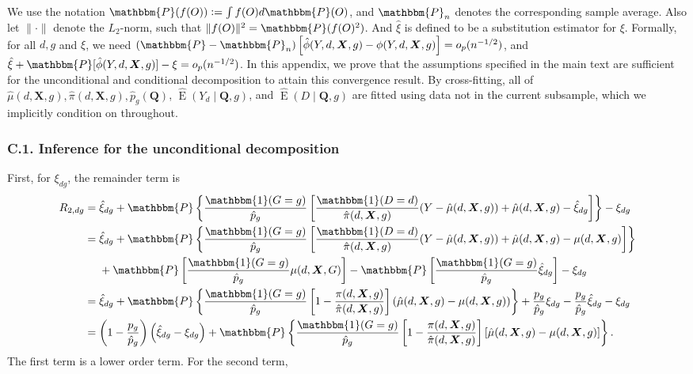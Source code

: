 \documentclass[12pt,a4paper]{article}
\newcommand{\E}{\operatorname{E}}
\def\X{{\boldsymbol X}}
\def\Q{{\boldsymbol Q}}
\def\one{\mathbbm{1}}
\def\P{\mathbbm{P}}
\newcommand{\defeq}{\vcentcolon=}
\begin{document}
We use the notation $\P(f(O)) \defeq \int f(O)d\P(O)$, and $\P_n$ denotes the corresponding sample average. Also let $\| \cdot \|$ denote the $L_2$-norm, such that $\| f(O) \|^2=\P(f(O)^2)$. And $\hat{\xi}$ is defined to be a substitution estimator for $\xi$.
Formally, for all $d,g$ and $\xi$, we need $(\P-\P_n) \left[ \hat{\phi}(Y,d,\X,g)-\phi(Y,d,\X,g) \right]=o_p(n^{-1/2})$, 
and $ \hat{\xi} + \P[\hat{\phi}(Y,d,\X,g)] - \xi =o_p(n^{-1/2})$. In this appendix, we prove that the assumptions specified in the main text are sufficient for the unconditional and conditional decomposition to attain this convergence result. By cross-fitting, all of $\hat{\mu}(d,\X,g), \hat{\pi}(d,\X,g), \hat{p}_g(\Q)$, $\hat{\E}(Y_d \mid \Q,g)$, and $\hat{\E}(D \mid \Q,g)$ are fitted using data not in the current subsample, which we implicitly condition on throughout.

\subsubsection*{C.1. Inference for the unconditional decomposition}

First, for $\xi_{dg}$, the remainder term is 
\begin{align*}
    R_{2,dg} &= \hat{\xi}_{dg} + \P\left\{ \frac{\one(G=g)}{\hat{p}_g} \left[ \frac{\one(D=d)}{\hat{\pi}(d, \X,g)} (Y-\hat{\mu}(d,\X,g)) + \hat{\mu}(d,\X,g) - \hat{\xi}_{dg} \right] \right\} - \xi_{dg} 
    \\
    &= \hat{\xi}_{dg} + \P\left\{ \frac{\one(G=g)}{\hat{p}_g} \left[ \frac{\one(D=d)}{\hat{\pi}(d, \X,g)} (Y-\hat{\mu}(d,\X,g)) + \hat{\mu}(d,\X,g) - \mu(d,\X,g) \right] \right\}
    \\
    &\phantom{{}={}} + \P\left[\frac{\one(G=g)}{\hat{p}_g} \mu(d,\X,G)\right] - \P\left[\frac{\one(G=g)}{\hat{p}_g} \hat{\xi}_{dg} \right] - \xi_{dg} 
    \\
    &= \hat{\xi}_{dg} +  \P\left\{ \frac{\one(G=g)}{\hat{p}_g}  \left[1- \frac{\pi(d,\X,g)}{\hat{\pi}(d, \X,g)}\right] \left(\hat{\mu}(d,\X,g) - \mu(d,\X,g)\right) \right\} + \frac{p_g}{\hat{p}_g}\xi_{dg} - \frac{p_g}{\hat{p}_g}\hat{\xi}_{dg} - \xi_{dg} \\
    &= \left(1- \frac{p_g}{\hat{p}_g}\right) \left(\hat{\xi}_{dg} - \xi_{dg}\right) + \P\left\{ \frac{\one(G=g)}{\hat{p}_g}  \left[1- \frac{\pi(d,\X,g)}{\hat{\pi}(d, \X,g)}\right] \left[\hat{\mu}(d,\X,g) - \mu(d,\X,g)\right] \right\}.
\end{align*}
The first term is a lower order term. For the second term,
\end{document}
